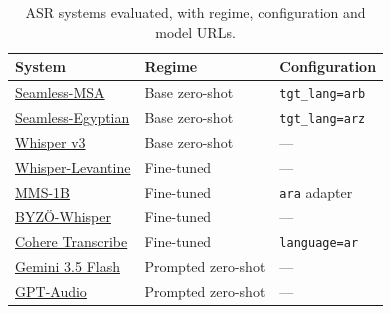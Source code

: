 \begin{table}[t]
\centering
\small
\begin{tabular}{l l l}
\toprule
\textbf{System} & \textbf{Regime} & \textbf{Configuration} \\
\midrule
\href{https://huggingface.co/facebook/seamless-m4t-v2-large}{Seamless-MSA} & Base zero-shot & \texttt{tgt\_lang=arb} \\
\href{https://huggingface.co/facebook/seamless-m4t-v2-large}{Seamless-Egyptian} & Base zero-shot & \texttt{tgt\_lang=arz} \\
\href{https://huggingface.co/openai/whisper-large-v3}{Whisper v3} & Base zero-shot & --- \\
\href{https://huggingface.co/HebArabNlpProject/WhisperLevantine}{Whisper-Levantine} & Fine-tuned & --- \\
\href{https://huggingface.co/facebook/mms-1b-all}{MMS-1B} & Fine-tuned & \texttt{ara} adapter \\
\href{https://huggingface.co/Yusser/whisper-dialect-Mauritania_Algeria_Morocco_Yemen_UAE_Egypt_Palestine_Jordan-ft-first-stage}{BYZÖ-Whisper} & Fine-tuned & --- \\
\href{https://huggingface.co/CohereLabs/cohere-transcribe-arabic-07-2026}{Cohere Transcribe} & Fine-tuned & \texttt{language=ar} \\
\href{https://ai.google.dev/gemini-api/docs/audio}{Gemini 3.5 Flash} & Prompted zero-shot & --- \\
\href{https://platform.openai.com/docs/guides/audio}{GPT-Audio} & Prompted zero-shot & --- \\
\bottomrule
\end{tabular}
\caption{ASR systems evaluated, with regime, configuration and model URLs.}
\label{tab:asr-models}
\end{table}
